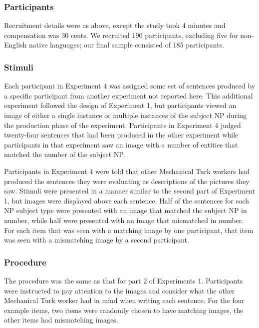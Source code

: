 \documentclass[10pt,letterpaper]{article}
\begin{document}
\subsubsection{Participants} 

Recruitment details were as above, except the study took 4 minutes and compensation was 30 cents. We recruited 190 participants, excluding five for non-English native languages; our final sample consisted of 185 participants.

\subsubsection{Stimuli} 

Each participant in Experiment 4 was assigned some set of sentences produced by a specific participant from another experiment not reported here. This additional experiment followed the design of Experiment 1, but participants viewed an image of either a single instance or multiple instances of the subject NP during the production phase of the experiment. Participants in Experiment 4 judged twenty-four sentences that had been produced in the other experiment while participants in that experiment saw an image with a number of entities that matched the number of the subject NP.

Participants in Experiment 4 were told that other Mechanical Turk workers had produced the sentences they were evaluating as descriptions of the pictures they saw. Stimuli were presented in a manner similar to the second part of Experiment 1, but images were displayed above each sentence. Half of the sentences for each NP subject type were presented with an image that matched the subject NP in number, while half were presented with an image that mismatched in number. For each item that was seen with a matching image by one participant, that item was seen with a mismatching image by a second participant. 

\subsubsection{Procedure}

The procedure was the same as that for part 2 of Experiments 1. Participants were instructed to pay attention to the images and consider what the other Mechanical Turk worker had in mind when writing each sentence. For the four example items, two items were randomly chosen to have matching images, the other items had mismatching images. 
\end{document}
